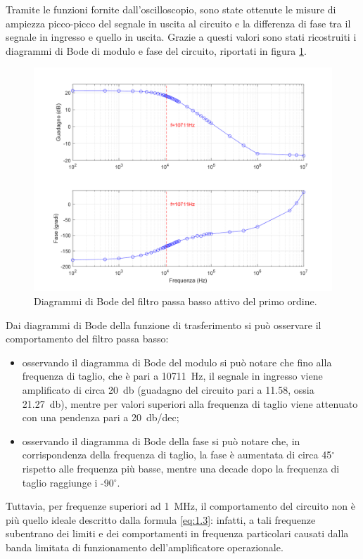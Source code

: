 \newpage
\noindent
Tramite le funzioni fornite dall'oscilloscopio, sono state ottenute le misure di ampiezza picco-picco del segnale in uscita al circuito e la differenza di fase tra il segnale in ingresso e quello in uscita. Grazie a questi valori sono stati ricostruiti i diagrammi di Bode di modulo e fase del circuito, riportati in figura \ref{fig:diagrammi_di_Bode}.
\begin{figure}[h!]
	\centering
	\includegraphics[width=0.80\linewidth]{./ImageFiles/Laboratorio 1/Diagrammi di Bode.png}
	\caption{Diagrammi di Bode del filtro passa basso attivo del primo ordine.}
	\label{fig:diagrammi_di_Bode}
\end{figure}
Dai diagrammi di Bode della funzione di trasferimento si può osservare il comportamento del filtro passa basso:
\begin{itemize}
	\item osservando il diagramma di Bode del modulo si può notare che fino alla frequenza di taglio, che è pari a \SI{10711}{\hertz}, il segnale in ingresso viene amplificato di circa \SI{20}{\decibel} (guadagno del circuito pari a 11.58, ossia \SI{21.27}{\decibel}), mentre per valori superiori alla frequenza di taglio viene attenuato con una pendenza pari a \SI{20}{\decibel}/dec;
	\item osservando il diagramma di Bode della fase si può notare che, in corrispondenza della frequenza di taglio, la fase è aumentata di circa 45$^{\circ}$rispetto alle frequenza più basse, mentre una decade dopo la frequenza di taglio raggiunge i -90$^{\circ}$. 
\end{itemize}

\noindent
Tuttavia, per frequenze superiori ad \SI{1}{\mega\hertz}, il comportamento del circuito non è più quello ideale descritto dalla formula \ref{eq:1.3}: infatti, a tali frequenze subentrano dei limiti e dei comportamenti in frequenza particolari causati dalla banda limitata di funzionamento dell'amplificatore operazionale.

